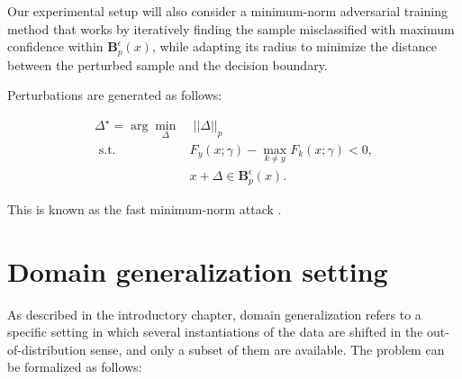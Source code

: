 Our experimental setup will also consider a minimum-norm 
adversarial training method that works by iteratively finding the 
sample misclassified with maximum confidence within $\mathbf{B}_p^\epsilon(x)$,
while adapting its radius to minimize the distance between the perturbed
sample and the decision boundary.

\begin{attack}
    Perturbations are generated as follows:
    
    $$
        \begin{aligned}
            \Delta^\star = \arg \min_\Delta & \; ||\Delta||_p \\
            \text { s.t. } & F_y(x; \gamma)- \max_{k \neq y} F_k(x; \gamma) < 0, \\
            & x + \Delta \in \mathbf{B}_p^\epsilon(x).
        \end{aligned}
    $$

    This is known as the fast minimum-norm attack
    \cite{pintorFastMinimumnormAdversarial2021}.
\end{attack}


\section{Domain generalization setting}\label{sec:domain_generalization_setting}

As described in the introductory chapter, domain generalization
refers to a specific setting in which several instantiations of
the data are shifted in the out-of-distribution sense, and only a subset of them
are available. The problem can be formalized as follows:

